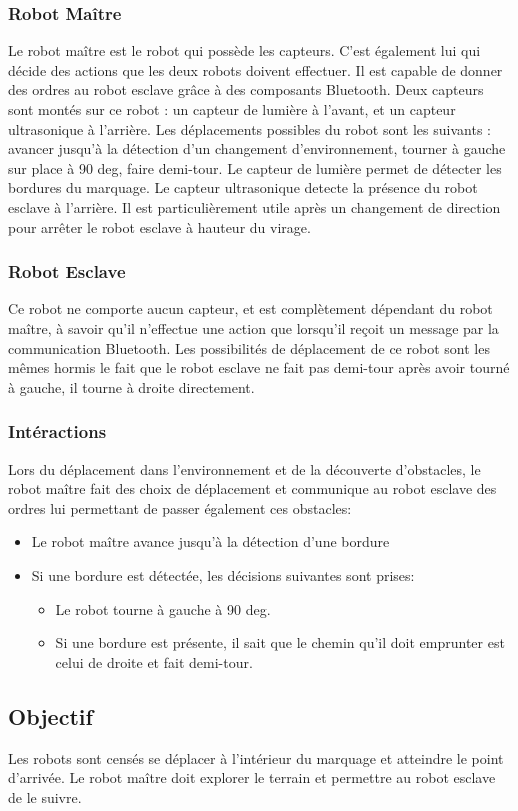    \subsubsection{Robot Ma\^{i}tre}
   Le robot ma\^{i}tre est le robot qui poss\`{e}de les capteurs. C'est
   \'{e}galement lui qui d\'{e}cide des actions que les deux robots doivent
   effectuer. Il est capable de donner des ordres au robot esclave
   gr\^{a}ce \`{a} des composants Bluetooth. Deux capteurs sont mont\'{e}s sur
   ce robot : un capteur de lumi\`{e}re \`{a} l'avant, et un capteur
   ultrasonique \`{a} l'arri\`{e}re. Les d\'{e}placements possibles du robot sont
   les suivants : avancer jusqu'\`{a} la d\'{e}tection d'un changement
   d'environnement, tourner \`{a} gauche sur place \`{a}
   90 deg, faire demi-tour. Le
   capteur de lumi\`{e}re permet de d\'{e}tecter les bordures du marquage. Le
   capteur ultrasonique detecte la pr\'{e}sence du robot esclave \`{a}
   l'arri\`{e}re. Il est particuli\`{e}rement utile apr\`{e}s un changement de
   direction pour arr\^{e}ter le robot esclave \`{a} hauteur du virage. 

   \subsubsection{Robot Esclave}
   Ce robot ne comporte aucun capteur, et est compl\`{e}tement d\'{e}pendant du
   robot ma\^{i}tre, \`{a} savoir qu'il n'effectue une action que lorsqu'il
   re\c coit un message par la communication Bluetooth. Les possibilit\'{e}s de
   d\'{e}placement de ce robot sont les m\^{e}mes hormis le fait que le robot esclave ne fait pas demi-tour après avoir tourné à gauche, il tourne à droite directement.

   \subsubsection{Int\'{e}ractions}
   Lors du d\'{e}placement dans l'environnement et de la d\'{e}couverte
   d'obstacles, le robot ma\^{i}tre fait des choix de d\'{e}placement et
   communique au robot esclave des ordres lui permettant de passer
   \'{e}galement ces obstacles:
   \begin{itemize}
    \item Le robot ma\^{i}tre avance jusqu'\`{a} la d\'{e}tection d'une bordure
    \item Si une bordure est d\'{e}tect\'{e}e, les d\'{e}cisions suivantes sont
	  prises:
    \begin{itemize}
     \item Le robot tourne \`{a} gauche \`{a} 90 deg.
     \item Si une bordure est pr\'{e}sente, il sait que le chemin qu'il doit
	   emprunter est celui de droite et fait demi-tour.
    \end{itemize}
   \end{itemize}

  \subsection{Objectif}
  Les robots sont cens\'{e}s se d\'{e}placer \`{a} l'int\'{e}rieur du marquage et
  atteindre le point d'arriv\'{e}e. Le robot ma\^{i}tre doit explorer le terrain
  et permettre au robot esclave de le suivre. 
